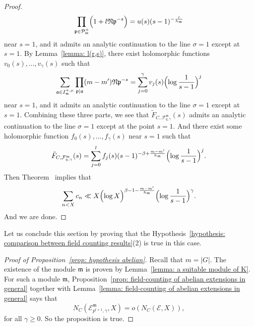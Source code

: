 \documentclass{amsart}
\numberwithin{equation}{section}
\theoremstyle{plain}
\theoremstyle{definition}
\theoremstyle{remark}
\begin{document}
\begin{proof}
\begin{equation}
		\prod_{\mathfrak{p}\in\mathcal{P}_{\mathfrak{m}}^+}
		\Bigl(
		1+l\mathfrak{Np}^{-s}
		\Bigr)
		=u(s)(s-1)^{-\frac{l}{h_{\mathfrak{m}}}}
	\end{equation}
	near $s=1$,
	and it admits an analytic continuation to the line $\sigma=1$ except at $s=1$.
	By Lemma~\ref{lemma: l(r,s)}, there exist holomorphic functions $v_0(s),\dots,v_{\gamma}(s)$ such that
	\begin{equation*}
		\sum_{\mathfrak{a}\in I^{+,\mu}_{\mathfrak{m}}}
		\prod_{\mathfrak{p}\mid\mathfrak{a}}
		(m-m')\mathfrak{Np}^{-s}
		=\sum_{j=0}^{\gamma}v_j(s)\Bigl(\log\frac{1}{s-1}\Bigr)^j
	\end{equation*}
	near $s=1$,
	and it admits an analytic continuation to the line $\sigma=1$ except at $s=1$.
	Combining these three parts, we see that $\tilde{F}_{C,\mathcal{F}_{q,\gamma}^{\mathfrak{m}}}(s)$ admits an analytic continuation to the line $\sigma=1$ except at the point $s=1$.
	And there exist some holomorphic function $f_0(s),\dots,f_{\gamma}(s)$ near $s=1$ such that
	\begin{equation*}
		\tilde{F}_{C,\mathcal{F}_{q,\gamma}^{\mathfrak{m}}}(s)=\sum_{j=0}^l f_j(s)(s-1)^{-\beta+\frac{m-m'}{h_{\mathfrak{m}}}}\Bigl(\log\frac{1}{s-1}\Bigr)^j.
	\end{equation*}
	Then Theorem~\cite[Appendix II Theorem I]{narkiewicz2014elementary} implies that
	\begin{equation*}
		\sum_{n<X}c_n\ll X\Bigl(\log X\Bigr)^{\beta-1-\frac{m-m'}{h_{\mathfrak{m}}}}\Bigl(\log\frac{1}{s-1}\Bigr)^{\gamma}.
	\end{equation*}
	And we are done.
\end{proof}
Let us conclude this section by proving that the Hypothesis~\ref{hypothesis: comparison between field counting results}(2) is true in this case.
\begin{proof}[Proof of Proposition~\ref{prop: hypothesis abelian}]
	Recall that $m=\lvert G\rvert$.
	The existence of the module $\mathfrak{m}$ is proven by Lemma~\ref{lemma: a suitable module of K}.
	For such a module $\mathfrak{m}$, Proposition~\ref{prop: field-counting of abelian extensions in general} together with Lemma~\ref{lemma: field-counting of abelian extensions in general} says that
	\begin{equation*}
		N_{C}(\mathcal{E}_{p^{l+1},\gamma}^{\mathfrak{m}},X)=o(N_{C}(\mathcal{E},X)),
	\end{equation*}
	for all $\gamma\geq0$.
	So the proposition is true.
\end{proof}
\end{document}
